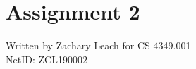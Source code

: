 \documentclass[twoside,12pt,a4paper,english]{memoir}
\begin{document}
\chapter{Assignment 2}
Written by Zachary Leach for CS 4349.001 \\
NetID: ZCL190002
 



 

\end{document}
